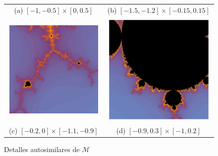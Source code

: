 \begin{figure}[ht]
\begin{tabular}{cc}
  (a) $[-1,-0.5]\times[0,0.5]$ & (b) $[-1.5,-1.2]\times[-0.15,0.15]$ \\[6pt]
  \includegraphics[scale=0.35]{./img/C3/mandelbrot-autosimilar-3.png} &   \includegraphics[scale=0.35]{./img/C3/mandelbrot-autosimilar-4.png} \\
  (c) $[-0.2,0]\times[-1.1,-0.9]$ & (d) $[-0.9,0.3]\times[-1,0.2]$ \\[6pt]
  \end{tabular}
  \caption{Detalles autosimilares de $\mathcal{M}$}
  \label{fig:detalles-mandelbrot}
\end{figure}

